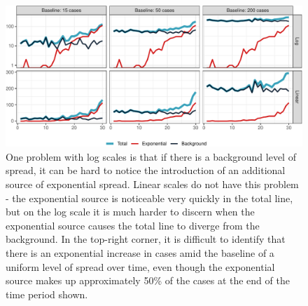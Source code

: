 \documentclass[article]{jdssv}\usepackage[]{graphicx}\usepackage[]{xcolor}
\newenvironment{knitrout}{}{} %
\begin{document}
\begin{knitrout}\footnotesize
{}\color{fgcolor}\begin{figure}

{\centering \includegraphics[width=.95\linewidth]{Figures_R/fig-log-scale-failures-1} 

}

\caption[One problem with log scales is that if there is a background level of spread, it can be hard to notice the introduction of an additional source of exponential spread]{One problem with log scales is that if there is a background level of spread, it can be hard to notice the introduction of an additional source of exponential spread. Linear scales do not have this problem - the exponential source is noticeable very quickly in the total line, but on the log scale it is much harder to discern when the exponential source causes the total line to diverge from the background. In the top-right corner, it is difficult to identify that there is an exponential increase in cases amid the baseline of a uniform level of spread over time, even though the exponential source makes up approximately 50\% of the cases at the end of the time period shown.}\label{fig:log-scale-failures}
\end{figure}

\end{knitrout}

\end{document}
